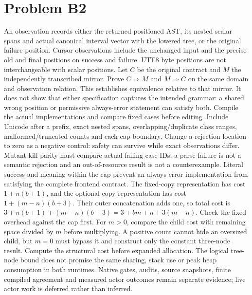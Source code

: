 \documentclass[11pt]{article}
\begin{document}
\section*{Problem B2}\label{ans:B2}
\begin{answer}
An observation records either the returned positioned AST, its nested scalar
spans and actual canonical interval vector with the lowered tree, or the
original failure position. Cursor observations include the unchanged input
and the precise old and final positions on success and failure. UTF8 byte
positions are not interchangeable with scalar positions.
Let $C$ be the original contract and $M$ the independently transcribed mirror.
Prove $C\Rightarrow M$ and $M\Rightarrow C$ on the same domain and observation
relation. This establishes equivalence relative to that mirror. It does not
show that either specification captures the intended grammar: a shared wrong
position or permissive always-error statement can satisfy both.
Compile the actual implementations and compare fixed cases before editing.
Include Unicode after a prefix, exact nested spans, overlapping/duplicate class
ranges, malformed/truncated counts and each cap boundary. Change a rejection
location to zero as a negative control: safety can survive while exact
observations differ. Mutant-kill parity must compare actual failing case IDs;
a parse failure is not a semantic rejection and an out-of-resource result is
not a counterexample. Literal success and meaning within the cap prevent an
always-error implementation from satisfying the complete frontend contract.
The fixed-copy representation has cost $1+n(b+1)$, and the optional-copy
representation has cost $1+(m-n)(b+3)$. Their outer concatenation adds one,
so total cost is $3+n(b+1)+(m-n)(b+3)=3+bm+n+3(m-n)$.
Check the fixed overhead against the cap first. For $m>0$, compare the child
cost with remaining space divided by $m$ before multiplying. A positive count
cannot hide an oversized child, but $m=0$ must bypass it and construct only the
constant three-node result. Compute the structural cost before expanded
allocation. The logical tree-node bound does not promise the same sharing,
stack use or peak heap consumption in both runtimes. Native gates, audits,
source snapshots, finite compiled agreement and measured actor outcomes
remain separate evidence; live actor work is deferred rather than inferred.
\end{answer}
\end{document}
